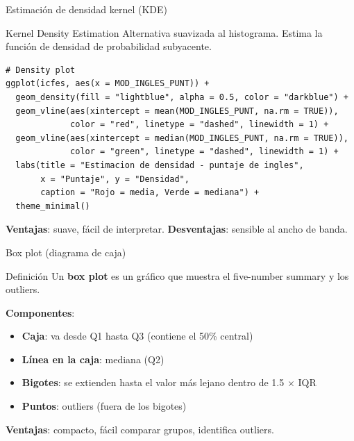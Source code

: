\documentclass[aspectratio=169, 11pt]{beamer}
\begin{document}
\begin{frame}[fragile]{Estimación de densidad kernel (KDE)}
\begin{block}{Kernel Density Estimation}
Alternativa suavizada al histograma. Estima la función de densidad de probabilidad subyacente.
\end{block}

\begin{lstlisting}
# Density plot
ggplot(icfes, aes(x = MOD_INGLES_PUNT)) +
  geom_density(fill = "lightblue", alpha = 0.5, color = "darkblue") +
  geom_vline(aes(xintercept = mean(MOD_INGLES_PUNT, na.rm = TRUE)),
             color = "red", linetype = "dashed", linewidth = 1) +
  geom_vline(aes(xintercept = median(MOD_INGLES_PUNT, na.rm = TRUE)),
             color = "green", linetype = "dashed", linewidth = 1) +
  labs(title = "Estimacion de densidad - puntaje de ingles",
       x = "Puntaje", y = "Densidad",
       caption = "Rojo = media, Verde = mediana") +
  theme_minimal()
\end{lstlisting}

\textbf{Ventajas}: suave, fácil de interpretar.
\textbf{Desventajas}: sensible al ancho de banda.
\end{frame}

\begin{frame}{Box plot (diagrama de caja)}
\begin{block}{Definición}
Un \textbf{box plot} es un gráfico que muestra el five-number summary y los outliers.
\end{block}

\textbf{Componentes}:
\begin{itemize}
\item \textbf{Caja}: va desde Q1 hasta Q3 (contiene el 50\% central)
\item \textbf{Línea en la caja}: mediana (Q2)
\item \textbf{Bigotes}: se extienden hasta el valor más lejano dentro de 1.5 $\times$ IQR
\item \textbf{Puntos}: outliers (fuera de los bigotes)
\end{itemize}

\begin{center}
\end{center}

\textbf{Ventajas}: compacto, f\'acil comparar grupos, identifica outliers.
\end{frame}
\end{document}
